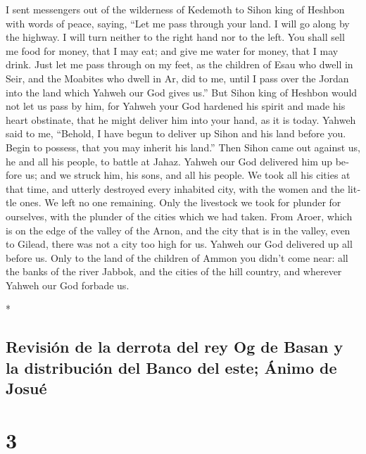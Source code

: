 \begin{paracol}{2}
\begin{otherlanguage}{english}
 I sent messengers out of the wilderness of Kedemoth to
Sihon king of Heshbon with words of peace, saying,  ``Let
me pass through your land. I will go along by the highway. I will turn
neither to the right hand nor to the left.  You shall
sell me food for money, that I may eat; and give me water for money,
that I may drink. Just let me pass through on my feet, 
as the children of Esau who dwell in Seir, and the Moabites who dwell in
Ar, did to me, until I pass over the Jordan into the land which Yahweh
our God gives us.''  But Sihon king of Heshbon would not
let us pass by him, for Yahweh your God hardened his spirit and made his
heart obstinate, that he might deliver him into your hand, as it is
today.  Yahweh said to me, ``Behold, I have begun to
deliver up Sihon and his land before you. Begin to possess, that you may
inherit his land.''  Then Sihon came out against us, he
and all his people, to battle at Jahaz.  Yahweh our God
delivered him up before us; and we struck him, his sons, and all his
people.  We took all his cities at that time, and utterly
destroyed every inhabited city, with the women and the little ones. We
left no one remaining.  Only the livestock we took for
plunder for ourselves, with the plunder of the cities which we had
taken.  From Aroer, which is on the edge of the valley of
the Arnon, and the city that is in the valley, even to Gilead, there was
not a city too high for us. Yahweh our God delivered up all before us.
 Only to the land of the children of Ammon you didn't
come near: all the banks of the river Jabbok, and the cities of the hill
country, and wherever Yahweh our God forbade us.

\end{otherlanguage}

\switchcolumn[0]*

\hypertarget{revisiuxf3n-de-la-derrota-del-rey-og-de-basan-y-la-distribuciuxf3n-del-banco-del-este-uxe1nimo-de-josuuxe9}{%
\subsection{Revisión de la derrota del rey Og de Basan y la distribución
del Banco del este; Ánimo de
Josué}\label{revisiuxf3n-de-la-derrota-del-rey-og-de-basan-y-la-distribuciuxf3n-del-banco-del-este-uxe1nimo-de-josuuxe9}}

\hypertarget{section-4}{%
\section{3}\label{section-4}}


\end{paracol}
